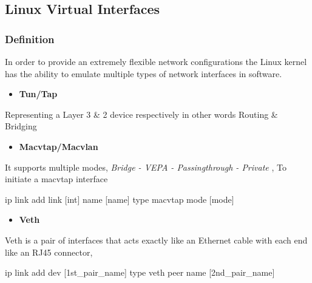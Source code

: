 \documentclass[
  14pt,
  english,
  a4paper,
]{scrreprt}
\newenvironment{Shaded}{}{}
\newcommand{\ExtensionTok}[1]{#1}
\newcommand{\NormalTok}[1]{#1}
\providecommand{\tightlist}{%
  \setlength{\itemsep}{0pt}\setlength{\parskip}{0pt}}
\begin{document}
\hypertarget{linux-virtual-interfaces}{%
\subsection{Linux Virtual Interfaces}\label{linux-virtual-interfaces}}

\hypertarget{definition-11}{%
\subsubsection{Definition}\label{definition-11}}

In order to provide an extremely flexible network configurations the
Linux kernel has the ability to emulate multiple types of network
interfaces in software.

\begin{itemize}
\tightlist
\item
  \textbf{Tun/Tap}
\end{itemize}

Representing a Layer 3 \& 2 device respectively in other words Routing
\& Bridging

\begin{itemize}
\tightlist
\item
  \textbf{Macvtap/Macvlan}
\end{itemize}

It supports multiple modes, \emph{Bridge - VEPA - Passingthrough -
Private }, To initiate a macvtap interface

\begin{Shaded}
\begin{Highlighting}[]
\ExtensionTok{ip}\NormalTok{ link add link [int] name [name] type macvtap mode [mode]}
\end{Highlighting}
\end{Shaded}

\begin{itemize}
\tightlist
\item
  \textbf{Veth}
\end{itemize}

Veth is a pair of interfaces that acts exactly like an Ethernet cable
with each end like an RJ45 connector,

\begin{Shaded}
\begin{Highlighting}[]
\ExtensionTok{ip}\NormalTok{ link add dev [1st\_pair\_name] type veth peer name [2nd\_pair\_name]}
\end{Highlighting}
\end{Shaded}
\end{document}
